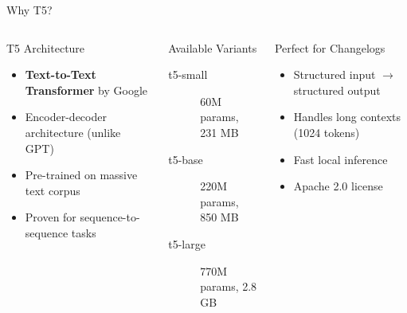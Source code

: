 \begin{frame}{Why T5?}
\begin{columns}
\begin{block}{T5 Architecture}
\begin{itemize}
  \item \textbf{Text-to-Text Transformer} by Google
  \item Encoder-decoder architecture (unlike GPT)
  \item Pre-trained on massive text corpus
  \item Proven for sequence-to-sequence tasks
\end{itemize}
\end{block}

\begin{block}{Available Variants}
\begin{description}
  \item[t5-small] 60M params, 231 MB
  \item[t5-base] 220M params, 850 MB
  \item[t5-large] 770M params, 2.8 GB
\end{description}
\end{block}
\begin{block}{Perfect for Changelogs}
\begin{itemize}
  \item Structured input $\rightarrow$ structured output
  \item Handles long contexts (1024 tokens)
  \item Fast local inference
  \item Apache 2.0 license
\end{itemize}
\end{block}
\end{columns}
\end{frame}

